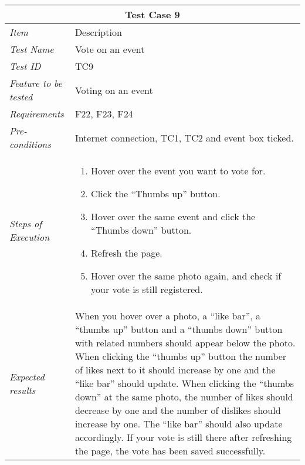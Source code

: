 %
\begin{minipage}{\linewidth}
\setlength{\tabcolsep}{15pt}
\centering
{}
\begin{tabular}{ |l|p{70mm}| }
	\hline
	\multicolumn{2}{|c|}{\cellcolor{gray!25} \textbf{Test Case 9}} \\
	\hline
	\it{\cellcolor{gray!25}Item} & {\cellcolor{gray!25} Description } \\
	\hline
	\it{\cellcolor{gray!25}Test Name } & Vote on an event \\ \hline
	\it{\cellcolor{gray!25}Test ID} & TC9 \\ \hline
	\it{\cellcolor{gray!25}Feature to be tested} & Voting on an event \\ \hline
	\it{\cellcolor{gray!25}Requirements} & F22, F23, F24  \\ \hline
	\it{\cellcolor{gray!25}Pre-conditions} & Internet connection, TC1, TC2 and event box ticked.  \\ \hline
	\it{\cellcolor{gray!25}Steps of Execution} & \begin{enumerate}
	                                       \item Hover over the event you want to vote for.
	                                       \item Click the “Thumbs up” button.
	                                       \item Hover over the same event and click the “Thumbs down” button.
	                                       \item Refresh the page.
	                                       \item Hover over the same photo again, and check if your vote is still registered.
	                                     \end{enumerate} \\ \hline
	\it{\cellcolor{gray!25}Expected results} & When you hover over a photo, a “like bar”, a “thumbs up” button and a “thumbs down” button with related numbers should appear below the photo. When clicking the “thumbs up” button the number of likes next to it should increase by one and the “like bar” should update. When clicking the “thumbs down” at the same photo, the number of likes should decrease by one and the number of dislikes should increase by one. The “like bar” should also update accordingly. If your vote is still there after refreshing the page, the vote has been saved successfully. \\
	\hline
\end{tabular}
\medskip
\end{minipage}

